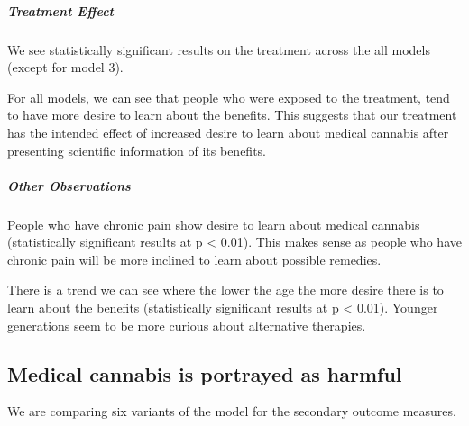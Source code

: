 \documentclass[
]{article}
\begin{document}
\hypertarget{treatment-effect}{%
\subparagraph{Treatment Effect}\label{treatment-effect}}

We see statistically significant results on the treatment across the all
models (except for model 3).

For all models, we can see that people who were exposed to the
treatment, tend to have more desire to learn about the benefits. This
suggests that our treatment has the intended effect of increased desire
to learn about medical cannabis after presenting scientific information
of its benefits.

\hypertarget{other-observations}{%
\subparagraph{Other Observations}\label{other-observations}}

People who have chronic pain show desire to learn about medical cannabis
(statistically significant results at p \textless{} 0.01). This makes
sense as people who have chronic pain will be more inclined to learn
about possible remedies.

There is a trend we can see where the lower the age the more desire
there is to learn about the benefits (statistically significant results
at p \textless{} 0.01). Younger generations seem to be more curious
about alternative therapies.

\pagebreak

\hypertarget{medical-cannabis-is-portrayed-as-harmful}{%
\subsection{Medical cannabis is portrayed as
harmful}\label{medical-cannabis-is-portrayed-as-harmful}}

We are comparing six variants of the model for the secondary outcome
measures.
\end{document}

